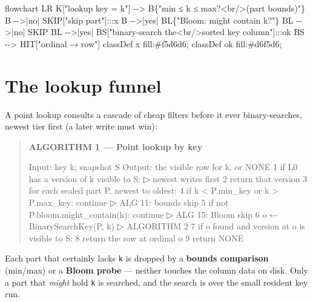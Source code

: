 \documentclass[
  11pt,
  openany]{book}
\newenvironment{Shaded}{}{}
\newcommand{\NormalTok}[1]{#1}
\begin{document}
\begin{Shaded}
\begin{Highlighting}[]
\NormalTok{flowchart LR}
\NormalTok{    K["lookup key = k"] {-}{-}\textgreater{} B\{"min ≤ k ≤ max?\textless{}br/\textgreater{}(part bounds)"\}}
\NormalTok{    B {-}{-}\textgreater{}|no| SKIP["skip part"]:::x}
\NormalTok{    B {-}{-}\textgreater{}|yes| BL\{"Bloom: might contain k?"\}}
\NormalTok{    BL {-}{-}\textgreater{}|no| SKIP}
\NormalTok{    BL {-}{-}\textgreater{}|yes| BS["binary{-}search the\textless{}br/\textgreater{}sorted key column"]:::ok}
\NormalTok{    BS {-}{-}\textgreater{} HIT["ordinal → row"]}
\NormalTok{    classDef x fill:\#f5d6d6; classDef ok fill:\#d6f5d6;}
\end{Highlighting}
\end{Shaded}

\section{The lookup funnel}\label{the-lookup-funnel}

A point lookup consults a cascade of cheap filters before it ever
binary-searches, newest tier first (a later write must win):

\begin{quote}
\textbf{ALGORITHM 1 --- Point lookup by key}

\begin{Shaded}
\begin{Highlighting}[]
\NormalTok{Input:  key k; snapshot S}
\NormalTok{Output: the visible row for k, or NONE}
\NormalTok{1  if L0 has a version of k visible to S:            ▷ newest writes first}
\NormalTok{2      return that version}
\NormalTok{3  for each sealed part P, newest to oldest:}
\NormalTok{4      if k \textless{} P.min\_key or k \textgreater{} P.max\_key: continue    ▷ ALG 11: bounds skip}
\NormalTok{5      if not P.bloom.might\_contain(k):    continue    ▷ ALG 15: Bloom skip}
\NormalTok{6      o ← BinarySearchKey(P, k)                       ▷ ALGORITHM 2}
\NormalTok{7      if o found and version at o is visible to S:}
\NormalTok{8          return the row at ordinal o}
\NormalTok{9  return NONE}
\end{Highlighting}
\end{Shaded}
\end{quote}

Each part that certainly lacks \texttt{k} is dropped by a \textbf{bounds
comparison} (min/max) or a \textbf{Bloom probe} --- neither touches the
column data on disk. Only a part that \emph{might} hold \texttt{k} is
searched, and the search is over the small resident key run.
\end{document}
